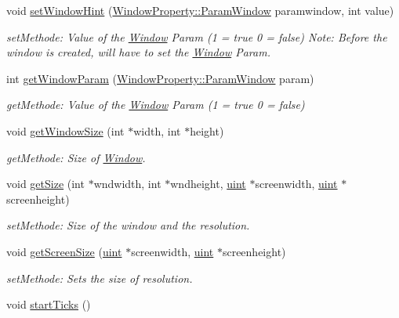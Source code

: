 \begin{DoxyCompactItemize}
void \hyperlink{class_f2_c_1_1_window_a8d5436c04afd4ea15ea541ff90d77138}{setWindowHint} (\hyperlink{namespace_f2_c_1_1_window_property_a89ec69d0a86f9d0063dfb69a3ebf3fbe}{WindowProperty::ParamWindow} paramwindow, int value)
\begin{DoxyCompactList}\small\item\em setMethode: Value of the \hyperlink{class_f2_c_1_1_window}{Window} Param (1 = true 0 = false) Note: Before the window is created, will have to set the \hyperlink{class_f2_c_1_1_window}{Window} Param. \item\end{DoxyCompactList}\item 
int \hyperlink{class_f2_c_1_1_window_add95e367e862fa5b4e71892920204bc3}{getWindowParam} (\hyperlink{namespace_f2_c_1_1_window_property_a89ec69d0a86f9d0063dfb69a3ebf3fbe}{WindowProperty::ParamWindow} param)
\begin{DoxyCompactList}\small\item\em getMethode: Value of the \hyperlink{class_f2_c_1_1_window}{Window} Param (1 = true 0 = false) \item\end{DoxyCompactList}\item 
void \hyperlink{class_f2_c_1_1_window_ad522ef19b23fc5e75a3194c8edbf618d}{getWindowSize} (int $\ast$width, int $\ast$height)
\begin{DoxyCompactList}\small\item\em getMethode: Size of \hyperlink{class_f2_c_1_1_window}{Window}. \item\end{DoxyCompactList}\item 
void \hyperlink{class_f2_c_1_1_window_a907540c263f7a326ca72e498f36aaddd}{getSize} (int $\ast$wndwidth, int $\ast$wndheight, \hyperlink{namespace_f2_c_a58be2bac9eb3e3c99cb41b6008bf4fae}{uint} $\ast$screenwidth, \hyperlink{namespace_f2_c_a58be2bac9eb3e3c99cb41b6008bf4fae}{uint} $\ast$screenheight)
\begin{DoxyCompactList}\small\item\em setMethode: Size of the window and the resolution. \item\end{DoxyCompactList}\item 
void \hyperlink{class_f2_c_1_1_window_a89e19f862d823bd9d9093022f5ebe314}{getScreenSize} (\hyperlink{namespace_f2_c_a58be2bac9eb3e3c99cb41b6008bf4fae}{uint} $\ast$screenwidth, \hyperlink{namespace_f2_c_a58be2bac9eb3e3c99cb41b6008bf4fae}{uint} $\ast$screenheight)
\begin{DoxyCompactList}\small\item\em setMethode: Sets the size of resolution. \item\end{DoxyCompactList}\item 
\hypertarget{class_f2_c_1_1_window_a0e50551a924c0c13757b892e5b17fdce}{
void \hyperlink{class_f2_c_1_1_window_a0e50551a924c0c13757b892e5b17fdce}{startTicks} ()}
\label{class_f2_c_1_1_window_a0e50551a924c0c13757b892e5b17fdce}


\end{DoxyCompactItemize}
